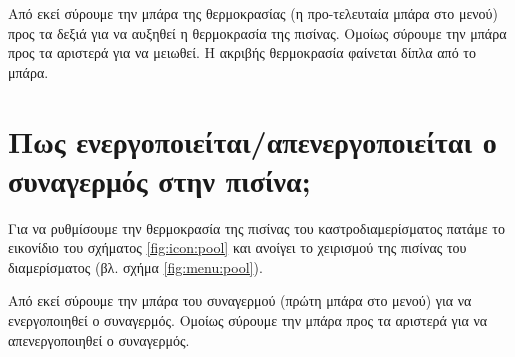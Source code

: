 \documentclass[a4paper,titlepage,twoside,12pt,leqno]{article}
\begin{document}
Από εκεί σύρουμε την μπάρα της θερμοκρασίας (η προ-τελευταία μπάρα στο μενού) προς τα δεξιά για να αυξηθεί η θερμοκρασία της πισίνας. Ομοίως σύρουμε την μπάρα προς τα αριστερά για να μειωθεί. Η ακριβής θερμοκρασία φαίνεται δίπλα από το μπάρα.  

\section{Πως ενεργοποιείται/απενεργοποιείται ο συναγερμός στην πισίνα;}

Για να ρυθμίσουμε την θερμοκρασία της πισίνας του καστροδιαμερίσματος πατάμε το εικονίδιο του σχήματος \ref{fig:icon:pool} και ανοίγει το χειρισμού της πισίνας του διαμερίσματος (βλ. σχήμα \ref{fig:menu:pool}).

Από εκεί σύρουμε την μπάρα του συναγερμού (πρώτη μπάρα στο μενού) για να ενεργοποιηθεί ο συναγερμός. Ομοίως σύρουμε την μπάρα προς τα αριστερά για να απενεργοποιηθεί ο συναγερμός.
\end{document}

